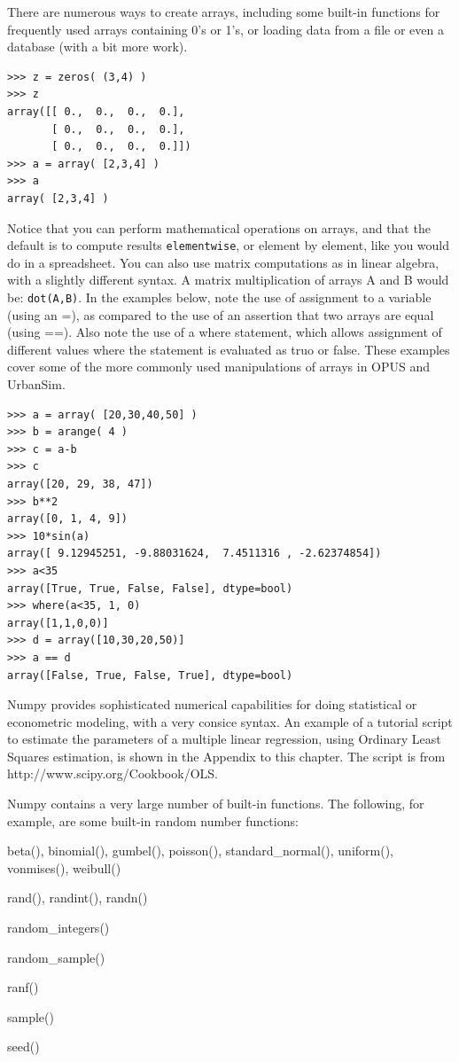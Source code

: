 There are numerous ways to create arrays, including some built-in functions for frequently used arrays containing 0's or 1's, or loading data from a file or even a database (with a bit more work).

\begin{lstlisting}
>>> z = zeros( (3,4) )
>>> z
array([[ 0.,  0.,  0.,  0.],
       [ 0.,  0.,  0.,  0.],
       [ 0.,  0.,  0.,  0.]])
>>> a = array( [2,3,4] )
>>> a
array( [2,3,4] )
\end{lstlisting}

Notice that you can perform mathematical operations on arrays, and that the default is to compute results \verb#elementwise#, or element by element, like you would do in a spreadsheet.  You can also use matrix computations as in linear algebra, with a slightly different syntax.   A matrix multiplication of arrays A and B would be: \verb#dot(A,B)#.  In the examples below, note the use of assignment to a variable (using an =), as compared to the use of an assertion that two arrays are equal (using ==). Also note the use of a where statement, which allows assignment of different values where the statement is evaluated as truo or false.  These examples cover some of the more commonly used manipulations of arrays in OPUS and UrbanSim.

\begin{lstlisting}
>>> a = array( [20,30,40,50] )
>>> b = arange( 4 )
>>> c = a-b
>>> c
array([20, 29, 38, 47])
>>> b**2
array([0, 1, 4, 9])
>>> 10*sin(a)
array([ 9.12945251, -9.88031624,  7.4511316 , -2.62374854])
>>> a<35
array([True, True, False, False], dtype=bool)
>>> where(a<35, 1, 0)
array([1,1,0,0)]
>>> d = array([10,30,20,50)]
>>> a == d
array([False, True, False, True], dtype=bool)
\end{lstlisting}

Numpy provides sophisticated numerical capabilities for doing statistical or econometric modeling, with a very consice syntax.  An example of a tutorial script to estimate  the parameters of a multiple linear regression, using Ordinary Least Squares estimation, is shown in the Appendix to this chapter.  The script is from http://www.scipy.org/Cookbook/OLS.



Numpy contains a very large number of built-in functions. The following, for example, are some built-in random number functions:

\squishlist
\item beta(), binomial(), gumbel(), poisson(), standard\_normal(), uniform(), vonmises(), weibull()
\item rand(), randint(), randn()
\item random\_integers()
\item random\_sample()
\item ranf()
\item sample()
\item seed()
\squishend

